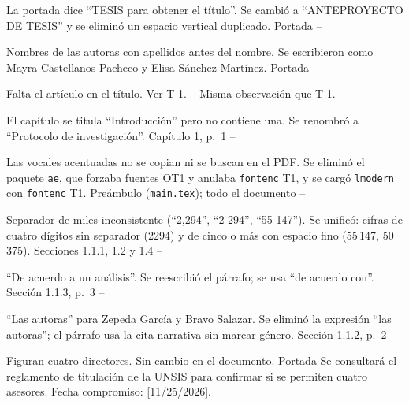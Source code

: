\documentclass[10pt]{article}
\begin{document}
\begin{matriz}
  {La portada dice ``TESIS para obtener el título''.}
  {Se cambió a ``ANTEPROYECTO DE TESIS'' y se eliminó un espacio vertical duplicado.}
  {Portada}
  {\Atendida}{--}{}

  {Nombres de las autoras con apellidos antes del nombre.}
  {Se escribieron como Mayra Castellanos Pacheco y Elisa Sánchez Martínez.}
  {Portada}
  {\Atendida}{--}{}

  {Falta el artículo en el título.}
  {Ver T-1.}
  {--}
  {\Atendida}{Misma observación que T-1.}{}

  {El capítulo se titula ``Introducción'' pero no contiene una.}
  {Se renombró a ``Protocolo de investigación''.}
  {Capítulo 1, p.~1}
  {\Atendida}{--}{}

  {Las vocales acentuadas no se copian ni se buscan en el PDF.}
  {Se eliminó el paquete \texttt{ae}, que forzaba fuentes OT1 y anulaba \texttt{fontenc} T1, y se cargó \texttt{lmodern} con \texttt{fontenc} T1.}
  {Preámbulo (\texttt{main.tex}); todo el documento}
  {\Atendida}{--}{}

  {Separador de miles inconsistente (``2,294'', ``2 294'', ``55 147'').}
  {Se unificó: cifras de cuatro dígitos sin separador (2294) y de cinco o más con espacio fino (55\,147, 50\,375).}
  {Secciones 1.1.1, 1.2 y 1.4}
  {\Atendida}{--}{}

  {``De acuerdo a un análisis''.}
  {Se reescribió el párrafo; se usa ``de acuerdo con''.}
  {Sección 1.1.3, p.~3}
  {\Atendida}{--}{}

  {``Las autoras'' para Zepeda García y Bravo Salazar.}
  {Se eliminó la expresión ``las autoras''; el párrafo usa la cita narrativa sin marcar género.}
  {Sección 1.1.2, p.~2}
  {\Atendida}{--}{}

  {Figuran cuatro directores.}
  {Sin cambio en el documento.}
  {Portada}
  {\Pendiente}
  {Se consultará el reglamento de titulación de la UNSIS para confirmar si se permiten cuatro asesores. Fecha compromiso: [11/25/2026].}
  {}
\end{matriz}

\ResumenAtencion
\Firmas
\end{document}

